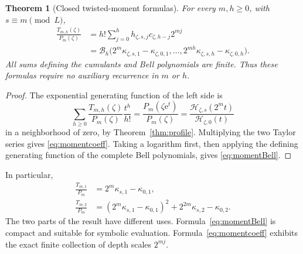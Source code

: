 \documentclass[11pt,letterpaper]{article}
\numberwithin{equation}{section}
\newtheorem{theorem}{Theorem}[section]
\theoremstyle{definition}
\theoremstyle{remark}
\newcommand{\B}{\mathcal B}
\newcommand{\Hp}{\mathcal H}
\newcommand{\e}{\mathrm e}
\begin{document}
\begin{theorem}[Closed twisted-moment formulas]
\label{thm:moments}
For every \(m,h\geq0\), with \(s\equiv m\pmod L\),
\begin{align}
 \frac{T_{m,h}(\zeta)}{P_m(\zeta)}
 &=h!\sum_{j=0}^h h_{\zeta,s,j}c_{\zeta,h-j}2^{mj}
 \label{eq:momentcoeff}\\
 &=\B_h\bigl(2^m\kappa_{\zeta,s,1}-\kappa_{\zeta,0,1},
      \ldots,2^{mh}\kappa_{\zeta,s,h}-\kappa_{\zeta,0,h}\bigr).
 \label{eq:momentBell}
\end{align}
All sums defining the cumulants and Bell polynomials are finite. Thus these formulas require no auxiliary recurrence in \(m\) or \(h\).
\end{theorem}
\begin{proof}
The exponential generating function of the left side is
\[
 \sum_{h\geq0}\frac{T_{m,h}(\zeta)}{P_m(\zeta)}\frac{t^h}{h!}
 =\frac{P_m(\zeta\e^t)}{P_m(\zeta)}
 =\frac{\Hp_{\zeta,s}(2^mt)}{\Hp_{\zeta,0}(t)}
\]
in a neighborhood of zero, by Theorem~\ref{thm:profile}. Multiplying the two Taylor series gives \eqref{eq:momentcoeff}. Taking a logarithm first, then applying the defining generating function of the complete Bell polynomials, gives \eqref{eq:momentBell}.
\end{proof}

In particular,
\begin{align}
 \frac{T_{m,1}}{P_m}&=2^m\kappa_{s,1}-\kappa_{0,1},\\
 \frac{T_{m,2}}{P_m}&=(2^m\kappa_{s,1}-\kappa_{0,1})^2
                         +2^{2m}\kappa_{s,2}-\kappa_{0,2}.
\end{align}
The two parts of the result have different uses. Formula~\eqref{eq:momentBell} is compact and suitable for symbolic evaluation. Formula~\eqref{eq:momentcoeff} exhibits the exact finite collection of depth scales \(2^{mj}\).
\end{document}
